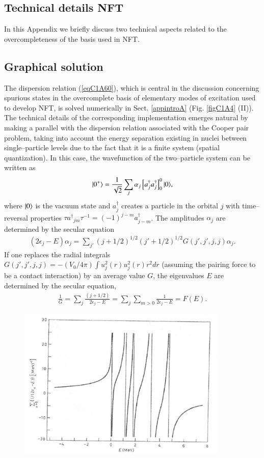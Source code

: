 \begin{subappendices}
\section{Technical details NFT}\label{App1.C}
In this Appendix we briefly discuss two technical aspects related to the overcompleteness of the basis used in NFT.
\subsection{Graphical solution}
The dispersion relation (\ref{eqC1A60}), which is central in the discussion concerning spurious states in the overcomplete basis of elementary modes of excitation used to develop NFT, is solved numerically in Sect. \ref{appintroA} (Fig. \ref{figC1A4} (II)). The technical details of the corresponding implementation emerges natural by making a parallel with the dispersion relation associated with the Cooper pair problem, taking into account the energy  separation existing in nuclei between single--particle levels due to the fact that it is a finite system (spatial quantization). In this case, the wavefunction of the two--particle system can be written as 
\begin{align}\label{eq1.C.1}
|{0^+} \rangle=\frac{1}{\sqrt{2}}\sum_j\alpha_j\left[a^\dagger_j a^\dagger_j\right]^0_0|{0} \rangle,
\end{align}
where $|{0} \rangle$ is the vacuum state and $a^\dagger_j$ creates a particle in the orbital $j$ with time--reversal properties $\tau a{^\dagger}_{jm}\tau^{-1}=(-1)^{j-m}a^\dagger_{j-m}$. The amplitudes $\alpha_j$ are determined by the secular equation  
\begin{align}\label{eq1.C.2}
(2\epsilon_j-E)\alpha_j=\sum_{j'}(j+1/2)^{1/2}(j'+1/2)^{1/2}G(j',j',j,j)\alpha_j.
\end{align}
If one replaces the radial integrals $G(j',j',j,j)=-(V_0/4\pi)\int u_j^2(r)u^2_j(r)r^2dr$ (assuming the pairing force to be a contact interaction) by an average value $G$, the eigenvalues $E$ are determined by the secular equation,
\begin{align}\label{eq1.C.3}
\frac{1}{G}=\sum_j\frac{(j+1/2)}{2\epsilon_j-E}=\sum_j\sum_{m>0}\frac{1}{2\epsilon_j-E}=F(E).
\end{align}
\begin{figure}
\centerline {
\includegraphics*[width=10cm]{introduccion/figs/fig1C1}
}
\end{figure}
\end{subappendices}
